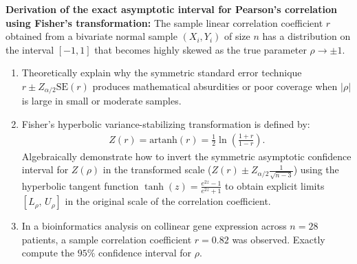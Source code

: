 \begin{problema}
	\label{prob:ic-desaf-fisher}
	\textbf{Derivation of the exact asymptotic interval for Pearson's correlation using Fisher's transformation:}
	The sample linear correlation coefficient $r$ obtained from a bivariate normal sample $(X_i, Y_i)$ of size $n$ has a distribution on the interval $[-1, 1]$ that becomes highly skewed as the true parameter $\rho \to \pm 1$.
	\begin{enumerate}
		\item Theoretically explain why the symmetric standard error technique $r \pm Z_{\alpha/2}\text{SE}(r)$ produces mathematical absurdities or poor coverage when $|\rho|$ is large in small or moderate samples.
		\item Fisher's hyperbolic variance-stabilizing transformation is defined by:
		\begin{align}
			Z(r) = \text{artanh}(r) = \frac{1}{2} \ln\left( \frac{1 + r}{1 - r} \right).
		\end{align}
		Algebraically demonstrate how to invert the symmetric asymptotic confidence interval for $Z(\rho)$ in the transformed scale ($Z(r) \pm Z_{\alpha/2}\frac{1}{\sqrt{n-3}}$) using the hyperbolic tangent function $\tanh(z) = \frac{e^{2z}-1}{e^{2z}+1}$ to obtain explicit limits $[L_\rho, \, U_\rho]$ in the original scale of the correlation coefficient.
		\item In a bioinformatics analysis on collinear gene expression across $n = 28$ patients, a sample correlation coefficient $r = 0.82$ was observed. Exactly compute the $95\%$ confidence interval for $\rho$.
	\end{enumerate}
\end{problema}

